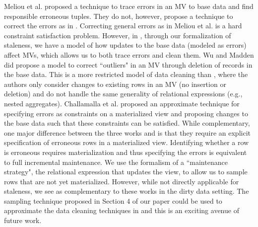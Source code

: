 Meliou et al. \cite{DBLP:conf/sigmod/MeliouGNS11} proposed a technique to trace errors in an MV to base data and find responsible erroneous tuples. 
They do not, however, propose a technique to correct the errors as in \svc.
Correcting general errors as in Meliou et al. is a hard constraint satisfaction problem.
However, in \svc, through our formalization of staleness, we have a model of how updates to the base data (modeled as errors) affect MVs, which allows us to both trace errors and clean them.
Wu and Madden \cite{DBLP:journals/pvldb/0002M13} did propose a model to correct ``outliers" in an MV through deletion of records in the base data.
This is a more restricted model of data cleaning than \svc, where the authors only consider changes to existing rows in an MV (no insertion or deletion) and do not handle the same generality of relational expressions (e.g., nested aggregates).
Challamalla et al. \cite{DBLP:conf/sigmod/ChalamallaIOP14} proposed an approximate technique for specifying errors as constraints on a materialized view and proposing changes to the base data such that these constraints can be satisfied.
While complementary, one major difference between the three works \cite{DBLP:conf/sigmod/MeliouGNS11, DBLP:journals/pvldb/0002M13, DBLP:conf/sigmod/ChalamallaIOP14} and \svc is that they require an explicit specification of erroneous rows in a materialized view.
Identifying whether a row is erroneous requires materialization and thus specifying the errors is equivalent to full incremental maintenance. 
We use the formalism of a ``maintenance strategy", the relational expression that updates the view, to allow us to sample rows that are not yet materialized.
However, while not directly applicable for staleness, we see \svc as complementary to these works in the dirty data setting. 
The sampling technique proposed in Section 4 of our paper could be used to approximate the data cleaning techniques in \cite{DBLP:conf/sigmod/MeliouGNS11, DBLP:journals/pvldb/0002M13, DBLP:conf/sigmod/ChalamallaIOP14} and this is an exciting avenue of future work.



